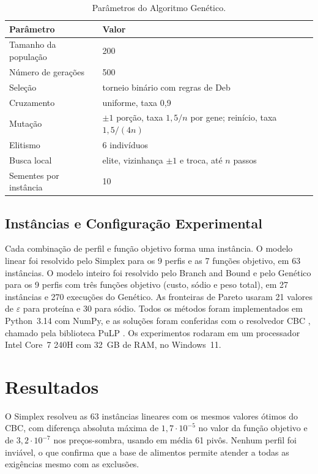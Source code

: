 \documentclass[12pt]{article}
\begin{document}
\begin{table}[ht]
\centering
\caption{Parâmetros do Algoritmo Genético.}\label{tab:parametros}
\footnotesize
\begin{tabular}{ll}
\toprule
Parâmetro & Valor \\
\midrule
Tamanho da população & 200 \\
Número de gerações & 500 \\
Seleção & torneio binário com regras de Deb \\
Cruzamento & uniforme, taxa 0,9 \\
Mutação & $\pm 1$ porção, taxa $1{,}5/n$ por gene; reinício, taxa $1{,}5/(4n)$ \\
Elitismo & 6 indivíduos \\
Busca local & elite, vizinhança $\pm 1$ e troca, até $n$ passos \\
Sementes por instância & 10 \\
\bottomrule
\end{tabular}
\end{table}

\subsection{Instâncias e Configuração Experimental}

Cada combinação de perfil e função objetivo forma uma instância. O modelo linear foi
resolvido pelo Simplex para os 9 perfis e as 7 funções objetivo, em 63 instâncias. O
modelo inteiro foi resolvido pelo Branch and Bound e pelo Genético para os 9 perfis com
três funções objetivo (custo, sódio e peso total), em 27 instâncias e 270 execuções do
Genético. As fronteiras de Pareto usaram 21 valores de $\varepsilon$ para proteína e 30
para sódio. Todos os métodos foram implementados em Python~3.14 com NumPy, e as
soluções foram conferidas com o resolvedor CBC \cite{forrest2005}, chamado pela
biblioteca PuLP \cite{mitchell2011}. Os experimentos rodaram em um processador Intel
Core~7 240H com 32~GB de RAM, no Windows~11.

\section{Resultados}\label{sec:resultados}

O Simplex resolveu as 63 instâncias lineares com os mesmos valores ótimos do CBC, com
diferença absoluta máxima de $1{,}7 \cdot 10^{-5}$ no valor da função objetivo e de
$3{,}2 \cdot 10^{-7}$ nos preços-sombra, usando em média 61 pivôs. Nenhum perfil foi
inviável, o que confirma que a base de alimentos permite atender a todas as exigências
mesmo com as exclusões.
\end{document}
